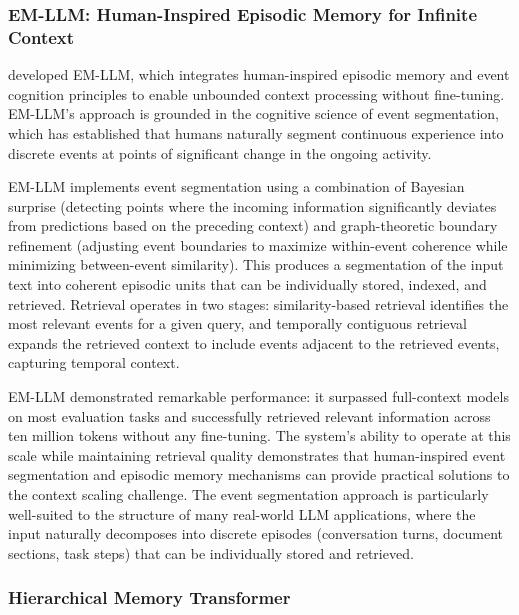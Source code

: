 \documentclass[11pt,letterpaper]{article}
\begin{document}
\subsubsection{EM-LLM: Human-Inspired Episodic Memory for Infinite Context}

\cite{hu2025emllm} developed EM-LLM, which integrates human-inspired episodic memory and event cognition principles to enable unbounded context processing without fine-tuning. EM-LLM's approach is grounded in the cognitive science of event segmentation, which has established that humans naturally segment continuous experience into discrete events at points of significant change in the ongoing activity.

EM-LLM implements event segmentation using a combination of Bayesian surprise (detecting points where the incoming information significantly deviates from predictions based on the preceding context) and graph-theoretic boundary refinement (adjusting event boundaries to maximize within-event coherence while minimizing between-event similarity). This produces a segmentation of the input text into coherent episodic units that can be individually stored, indexed, and retrieved. Retrieval operates in two stages: similarity-based retrieval identifies the most relevant events for a given query, and temporally contiguous retrieval expands the retrieved context to include events adjacent to the retrieved events, capturing temporal context.

EM-LLM demonstrated remarkable performance: it surpassed full-context models on most evaluation tasks and successfully retrieved relevant information across ten million tokens without any fine-tuning. The system's ability to operate at this scale while maintaining retrieval quality demonstrates that human-inspired event segmentation and episodic memory mechanisms can provide practical solutions to the context scaling challenge. The event segmentation approach is particularly well-suited to the structure of many real-world LLM applications, where the input naturally decomposes into discrete episodes (conversation turns, document sections, task steps) that can be individually stored and retrieved.

\subsubsection{Hierarchical Memory Transformer}
\end{document}
